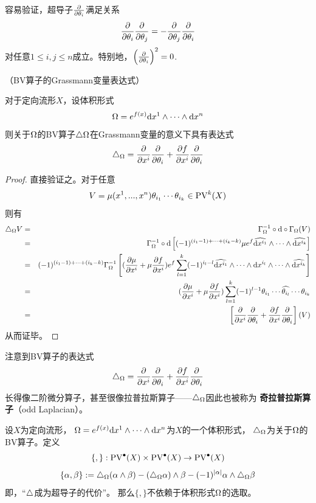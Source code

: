容易验证，超导子$\frac{\partial } {\partial \theta_i}$满足关系
$$\frac{\partial } {\partial \theta_i}\frac{\partial } {\partial \theta_j}=-\frac{\partial } {\partial \theta_j}\frac{\partial } {\partial \theta_i}$$
对任意$1\leq i,j\leq n$成立。特别地，$\left(\frac{\partial } {\partial \theta_i}\right)^2=0$.

\begin{prop}（BV算子的Grassmann变量表达式）

对于定向流形$X$，设体积形式
$$\Omega=e^{f(x)}\mathrm{d} x^1\wedge\cdots\wedge \mathrm{d} x^n$$
则关于$\Omega$的BV算子$\triangle\Omega$在Grassmann变量的意义下具有表达式
$$\triangle_{\Omega}=\frac{\partial } {\partial x^i}\frac{\partial } {\partial \theta_i}+\frac{\partial f} {\partial x^i}\frac{\partial } {\partial \theta_i}$$

\end{prop}

\begin{proof}
直接验证之。对于任意
$$V=\mu(x^1,...,x^n)\theta_{i_1}\cdots\theta_{i_k}\in\operatorname{PV}^{k}(X)$$
则有
\begin{eqnarray*}
     \triangle_\Omega V
&=&
     \Gamma_\Omega^{-1}\circ\mathrm{d}\circ\Gamma_\Omega(V)\\
&=&
     \Gamma_\Omega^{-1}\circ\mathrm{d}
     \left[
       (-1)^{(i_1-1)+\cdots+(i_k-k)}\mu e^{f}
       \widehat{\mathrm{d} x^{i_1}}\wedge\cdots\wedge\widehat{\mathrm{d} x^{i_k}}
     \right]\\
&=&
     (-1)^{(i_1-1)+\cdots+(i_k-k)}
     \Gamma_\Omega^{-1}
     \left[
       (\frac{\partial \mu} {\partial x^i}+\mu\frac{\partial f} {\partial x^i})e^f
       \sum_{l=1}^k
         (-1)^{i_l-l}
         \widehat{\mathrm{d} x^{i_1}}\wedge\cdots\wedge\mathrm{d} x^{i_l}
         \wedge\cdots\wedge\widehat{\mathrm{d} x^{i_k}}
     \right]\\
&=&
     (\frac{\partial \mu} {\partial x^i}+\mu\frac{\partial f} {\partial x^i})
     \sum_{l=1}^k
       (-1)^{l-1}
       \theta_{i_1}\cdots\widehat{\theta_{i_l}}\cdots \theta_{i_k}\\
&=&
    \left[
      \frac{\partial } {\partial x^i}\frac{\partial } {\partial \theta_i}+\frac{\partial f} {\partial x^i}\frac{\partial } {\partial \theta_i}
    \right](V)
\end{eqnarray*}
从而证毕。
\end{proof}

注意到BV算子的表达式
$$\triangle_{\Omega}=\frac{\partial } {\partial x^i}\frac{\partial } {\partial \theta_i}+\frac{\partial f} {\partial x^i}\frac{\partial } {\partial \theta_i}$$
长得像二阶微分算子，甚至很像拉普拉斯算子——$\triangle_\Omega$因此也被称为
\textbf{奇拉普拉斯算子}（odd Laplacian）。

\begin{prop}设$X$为定向流形，
$\Omega=e^{f(x)}\mathrm{d} x^1\wedge\cdots\wedge\mathrm{d} x^n$为$X$的一个体积形式，
$\triangle_\Omega$为关于$\Omega$的BV算子。定义
$$\{,\}:\operatorname{PV}^{\bullet}(X)\times\operatorname{PV}^{\bullet}(X) \to \operatorname{PV}^{\bullet}(X)$$
$$\{\alpha,\beta\}:=
\triangle_{\Omega}(\alpha\wedge\beta)-(\triangle_{\Omega}\alpha)\wedge\beta-
(-1)^{|\alpha|}\alpha\wedge\triangle_{\Omega}\beta$$
即，“$\triangle$成为超导子的代价”。
那么$\{,\}$不依赖于体积形式$\Omega$的选取。
\label{另一种Schouten-Nijenhuis括号-def}
\end{prop}

